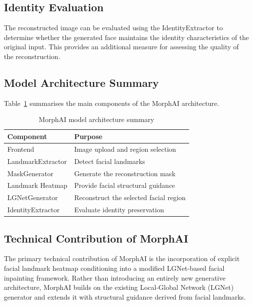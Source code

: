 \subsection{Identity Evaluation}

The reconstructed image can be evaluated using the IdentityExtractor
to determine whether the generated face maintains the identity
characteristics of the original input. This provides an additional
measure for assessing the quality of the reconstruction.



\subsection{Model Architecture Summary}

Table~\ref{tab:morphai_arch} summarises the main components of the
MorphAI architecture.

\begin{table}[H]
\centering
\caption{MorphAI model architecture summary}
\label{tab:morphai_arch}
\begin{tabular}{ll}
\hline
\textbf{Component} & \textbf{Purpose} \\
\hline
Frontend & Image upload and region selection \\
LandmarkExtractor & Detect facial landmarks \\
MaskGenerator & Generate the reconstruction mask \\
Landmark Heatmap & Provide facial structural guidance \\
LGNetGenerator & Reconstruct the selected facial region \\
IdentityExtractor & Evaluate identity preservation \\
\hline
\end{tabular}
\end{table}

\subsection{Technical Contribution of MorphAI}
The primary technical contribution of MorphAI is the incorporation of explicit facial 
landmark heatmap conditioning into a modified LGNet-based facial inpainting framework. Rather than introducing an entirely new generative architecture, MorphAI builds on the existing Local-Global Network (LGNet) generator and extends it with structural guidance 
derived from facial landmarks.

